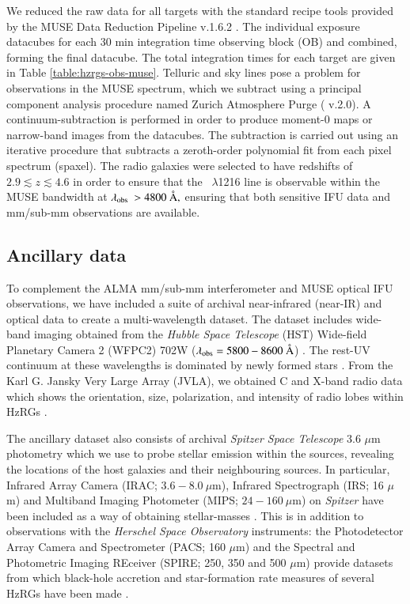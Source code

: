 We reduced the raw data for all targets with the standard recipe tools provided by the MUSE Data Reduction Pipeline  v.1.6.2 \citep{weilbacher2014}. The individual exposure datacubes for each 30 min integration time observing block (OB) and combined, forming the final datacube. The total integration times for each target are given in Table \ref{table:hzrgs-obs-muse}. Telluric and sky lines pose a problem for observations in the MUSE spectrum, which we subtract using a principal component analysis procedure named Zurich Atmosphere Purge ( v.2.0). A continuum-subtraction is performed in order to produce moment-0 maps or narrow-band images from the datacubes. The subtraction is carried out using an iterative procedure that subtracts a zeroth-order polynomial fit from each pixel spectrum (spaxel). The radio galaxies were selected to have redshifts of $2.9 \lesssim z \lesssim 4.6$ in order to ensure that the \lya~$\lambda$1216 line is observable within the MUSE bandwidth at $\lambda_{\rm obs}~> 4800~\mbox{\normalfont\AA },$ ensuring that both sensitive IFU data and mm/sub-mm observations are available.

\subsection{Ancillary data}
To complement the ALMA mm/sub-mm interferometer and MUSE optical IFU observations, we have included a suite of archival near-infrared (near-IR) and optical data to create a multi-wavelength dataset. The dataset includes wide-band imaging obtained from the {\it Hubble Space Telescope} (HST) Wide-field Planetary Camera 2 (WFPC2) 702W ($\lambda_{\rm obs} = 5800-8600~\mbox{\normalfont\AA }$) \citep{Pentericci1997}. The rest-UV continuum at these wavelengths is dominated by newly formed stars \citep{Overzier2001,reuland2003,morais2017}. From the Karl G. Jansky Very Large Array (JVLA), we obtained C and X-band radio data which shows the orientation, size, polarization, and intensity of radio lobes within HzRGs \citep{carilli1997}. 

The ancillary dataset also consists of archival {\it Spitzer Space Telescope} 3.6 $\mu$m photometry which we use to probe stellar emission within the sources, revealing the locations of the host galaxies and their  neighbouring sources. In particular, Infrared Array Camera (IRAC; $3.6-8.0~\mu$m), Infrared Spectrograph (IRS; 16 $\mu$m) and Multiband Imaging Photometer (MIPS; $24-160~\mu$m) on {\it Spitzer} have been included as a way of obtaining stellar-masses \citep{seymour2007,Debreuck2010}. This is in addition to observations with the {\it Herschel Space Observatory} instruments: the Photodetector Array Camera and Spectrometer (PACS; 160 $\mu$m) and the Spectral and Photometric Imaging REceiver (SPIRE; 250, 350 and 500 $\mu$m) provide datasets from which black-hole accretion and star-formation rate measures of several HzRGs have been made \citep{Drouart2014,falkendal2019}. 

